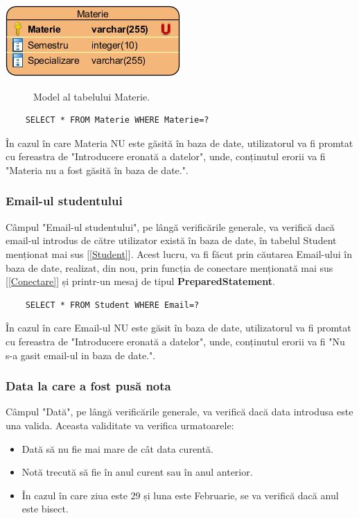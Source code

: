 \documentclass{article}
\begin{document}
	\begin{center}
		\includegraphics[scale=0.7]{Source/Materie}
		\begin{figure}[!h]
			{\caption*{Model al tabelului Materie.}}
		\end{figure}
	\end{center}

	\begin{verbatim}
	SELECT * FROM Materie WHERE Materie=?
	\end{verbatim}

	În cazul în care Materia NU este găsită în baza de date, utilizatorul va fi promtat cu fereastra de "Introducere eronată a datelor", unde, conținutul erorii va fi "Materia nu a fost găsită în baza de date.". 

		\subsubsection*{Email-ul studentului}

	Câmpul "Email-ul studentului", pe lângă verificările generale, va verifică dacă email-ul introdus de către utilizator există în baza de date, în tabelul Student menționat mai sus [\ref{Student}]. Acest lucru, va fi făcut prin căutarea Email-ului în baza de date, realizat, din nou, prin funcția de conectare menționată mai sus [\ref{Conectare}] și printr-un mesaj de tipul \textbf{PreparedStatement}.

	\begin{verbatim}
	SELECT * FROM Student WHERE Email=?
	\end{verbatim}

		În cazul în care Email-ul NU este găsit în baza de date, utilizatorul va fi promtat cu fereastra de "Introducere eronată a datelor", unde, conținutul erorii va fi "Nu s-a gasit email-ul in baza de date.". 
		\subsubsection*{Data la care a fost pusă nota}
	
	Câmpul "Dată", pe lângă verificările generale, va verifică dacă data introdusa este una valida. Aceasta validitate va verifica urmatoarele:
	\begin{itemize}
  		\item Dată să nu fie mai mare de cât data curentă.
		\item Notă trecută să fie în anul curent sau în anul anterior.
		\item În cazul în care ziua este 29 și luna este Februarie, se va verifică dacă anul este bisect.
	\end{itemize}
	
\end{document}
